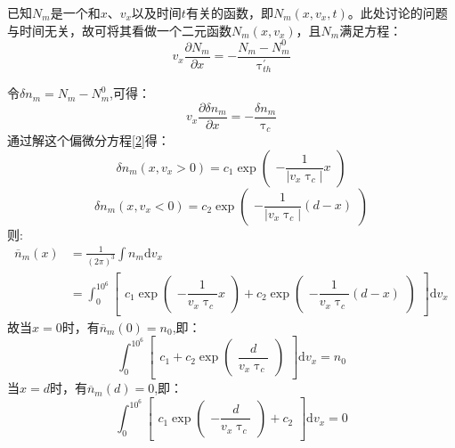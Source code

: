 \documentclass{article}
\begin{document}
\noindent 已知$N_m$是一个和$x$、$v_x$以及时间$t$有关的函数，即$N_m(x,v_x,t)$。此处讨论的问题与时间无关，故可将其看做一个二元函数$N_m(x,v_x)$，且$N_m$满足方程：
\begin{equation}\label{1}
v_x\frac{\partial N_m}{\partial x}=-\frac{N_m-N_m^0}{\uptau_{th}^{'}}
\end{equation}

令$\delta n_m=N_m-N_m^0$,可得：
\begin{equation}\label{2}
v_x\frac{\partial \delta n_m}{\partial x}=-\frac{\delta n_m}{\uptau_c}
\end{equation}
通过解这个偏微分方程\eqref{2}得：
\begin{equation}\label{3}
\delta n_m(x,v_x>0)=c_1\exp\begin{pmatrix}-\dfrac{1}{|v_x\uptau_c|}x\end{pmatrix}
\end{equation}
\begin{equation}\label{4}
\delta n_m(x,v_x<0)=c_2\exp\begin{pmatrix}-\dfrac{1}{|v_x\uptau_c|}(d-x)\end{pmatrix}
\end{equation}
则:
\begin{equation}\label{5}
\begin{aligned}
\overline{n}_m(x)&=\frac{1}{(2\pi)^3}\int n_m\mathrm{d}v_x\\
&=\int_0^{10^6}\begin{bmatrix}
c_1\exp\begin{pmatrix}-\dfrac{1}{v_x\uptau_c}x\end{pmatrix}+c_2\exp\begin{pmatrix}-\dfrac{1}{v_x\uptau_c}(d-x)\end{pmatrix}
\end{bmatrix}\mathrm{d}v_x
\end{aligned}
\end{equation}
故当$x=0$时，有$\overline{n}_m(0)=n_0$,即：
\begin{equation}\label{6}
\int_0^{10^6}\begin{bmatrix}c_1+c_2\exp\begin{pmatrix}\dfrac{d}{v_x\uptau_c}\end{pmatrix}\end{bmatrix}\mathrm{d}v_x=n_0
\end{equation}
当$x=d$时，有$\overline{n}_m(d)=0$,即：
\begin{equation}\label{7}
\int_0^{10^6}\begin{bmatrix}c_1\exp\begin{pmatrix}-\dfrac{d}{v_x\uptau_c}\end{pmatrix}+c_2\end{bmatrix}\mathrm{d}v_x=0
\end{equation}
\end{document}
